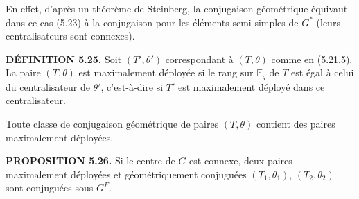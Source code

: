 \documentclass[9pt,twoside]{extarticle}
\begin{document}
{En effet, d'après un théorème de Steinberg, la conjugaison géométrique équivaut dans ce cas (5.23) à la conjugaison pour les éléments semi-simples de \(G^*\) (leurs centralisateurs sont connexes).\par

\noindent\textbf{DÉFINITION 5.25.} Soit \((T',\theta')\) correspondant à \((T,\theta)\) comme en (5.21.5). La paire \((T,\theta)\) est maximalement déployée si le rang sur \(\mathbb F_q\) de \(T\) est égal à celui du centralisateur de \(\theta'\), c'est-à-dire si \(T'\) est maximalement déployé dans ce centralisateur.\par

Toute classe de conjugaison géométrique de paires \((T,\theta)\) contient des paires maximalement déployées.\par

\noindent\textbf{PROPOSITION 5.26.} Si le centre de \(G\) est connexe, deux paires maximalement déployées et géométriquement conjuguées \((T_1,\theta_1)\), \((T_2,\theta_2)\) sont conjuguées sous \(G^F\).\par
}
\end{document}
